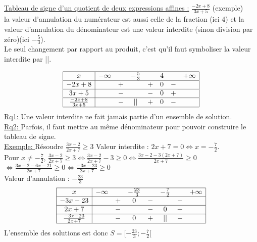\documentclass[12 pt,a4paper]{article}
\begin{document}
\underline{Tableau de signe d'un quotient de deux expressions affines :} $\frac{-2x+8}{3x+5}$ (exemple)\medskip\\
la valeur d'annulation du numérateur est aussi celle de la fraction (ici 4) et la valeur d'annulation du dénominateur est une valeur interdite (sinon division par zéro)(ici $-\frac{5}{3}$).\medskip\\
Le seul changement par rapport au produit, c'est qu'il faut symboliser la valeur interdite par ||.

\[\begin{array}{|c|ccccccc|}
\hline
x & -\infty & & -\frac{5}{3} & & 4 & & +\infty\\ \hline
-2x+8 & & + & & + & 0 & - & \\
\hline
3x+5 & & - & & - & 0 & + & \\
\hline
\frac{-2x+8}{3x+5} & & - & || & + & 0 & - & \\
\hline
\end{array}\]
\medskip
\underline{Rq1: } Une valeur interdite ne fait jamais partie d'un ensemble de solution.\medskip\\
\underline{Rq2: } Parfois, il faut mettre au même dénominateur pour pouvoir construire le tableau de signe.\medskip\\
\underline{Exemple: } Résoudre $\frac{3x-2}{2x+7}\geqslant3$
Valeur interdite : $2x+7=0\iff x=-\frac{7}{2}$.\medskip\\
Pour $x\neq -\frac{7}{2}$, $\frac{3x-2}{2x+7}\geqslant3\iff \frac{3x-2}{2x+7}-3\geqslant 0\iff \frac{3x-2-3(2x+7)}{2x+7}\geqslant 0$\medskip\\
$\iff \frac{3x-2-6x-21}{2x+7}\geqslant 0\iff \frac{-3x-23}{2x+7}\geqslant 0$\medskip\\
Valeur d'annulation : $-\frac{23}{3}$\medskip\\
\[\begin{array}{|c|ccccccc|}
\hline
x & -\infty & & -\frac{23}{3} & & -\frac{7}{2} & & +\infty\\ \hline
-3x-23 & & + & 0 & - & & - & \\
\hline
2x+7 & & - & & - & 0 & + & \\
\hline
\frac{-3x-23}{2x+7} & & - & 0 & + & || & - & \\
\hline
\end{array}\]
\medskip
L'ensemble des solutions est donc $S=[-\frac{23}{3};-\frac{7}{2}[$
\end{document}
